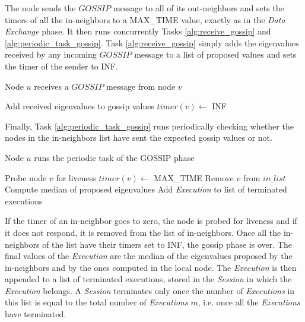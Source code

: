 \documentclass[a4paper,11pt,twoside]{report}
\begin{document}
 

The node sends the $GOSSIP$ message to all of its out-neighbors and sets the timers of all the in-neighbors to a MAX\_TIME value, exactly as in the \textit{Data Exchange} phase. It then runs concurrently Tasks \ref{alg:receive_gossip} and \ref{alg:periodic_task_gossip}. Task \ref{alg:receive_gossip} simply adds the eigenvalues received by any incoming $GOSSIP$ message to a list of proposed values and sets the timer of the sender to INF. 

\begin{algorithm}
 		\caption{Node $u$ receives a $GOSSIP$ message from node $v$}
 		\label{alg:receive_gossip}
 		\begin{algorithmic}[1]
		 \STATE Add received eigenvalues to gossip values
		 \STATE $timer(v) \leftarrow$ INF
		 \ENDIF
 		\end{algorithmic}
\end{algorithm}



Finally, Task \ref{alg:periodic_task_gossip} runs periodically checking whether the nodes in the in-neighbors list have sent the expected gossip values or not.

\begin{algorithm}
 		\caption{Node $u$ runs the periodic task of the GOSSIP phase}
 		\label{alg:periodic_task_gossip}
 		\begin{algorithmic}[1]
		 \STATE Probe node $v$ for liveness
		 \STATE $timer(v) \leftarrow$ MAX\_TIME
		 \ELSE
		 \STATE Remove $v$ from $in\_list$
		 \ENDIF
		 \ENDIF
		 \ENDFOR
		 \STATE Compute median of proposed eigenvalues
		 \STATE Add \textit{Execution} to list of terminated executions
		 \ENDIF
 		\end{algorithmic}
\end{algorithm}

If the timer of an in-neighbor goes to zero, the node is probed for liveness and if it does not respond, it is removed from the list of in-neighbors. Once all the in-neighbors of the list have their timers set to INF, the gossip phase is over. The final values of the \textit{Execution} are the median of the eigenvalues proposed by the in-neighbors and by the ones computed in the local node. The \textit{Execution} is then appended to a list of terminated executions, stored in the \textit{Session} in which the \textit{Execution} belongs. A \textit{Session} terminates only once the number of \textit{Executions} in this list is equal to the total number of \textit{Executions} $m$, i.e. once all the \textit{Executions} have terminated.
\end{document}
